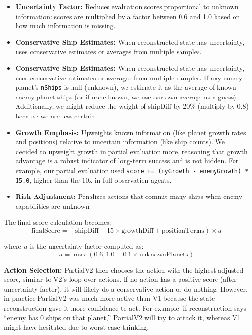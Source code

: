 \documentclass[conference]{IEEEtran}
\begin{document}
\begin{itemize}
\item \textbf{Uncertainty Factor:} Reduces evaluation scores proportional to unknown information: scores are multiplied by a factor between 0.6 and 1.0 based on how much information is missing.

\item \textbf{Conservative Ship Estimates:} When reconstructed state has uncertainty, uses conservative estimates or averages from multiple samples.

\item \textbf{Conservative Ship Estimates:} When reconstructed state has uncertainty, uses conservative estimates or averages from multiple samples. If any enemy planet's \texttt{nShips} is null (unknown), we estimate it as the average of known enemy planet ships (or if none known, we use our own average as a guess). Additionally, we might reduce the weight of shipDiff by 20\% (multiply by 0.8) because we are less certain.

\item \textbf{Growth Emphasis:} Upweights known information (like planet growth rates and positions) relative to uncertain information (like ship counts). We decided to upweight growth in partial evaluation more, reasoning that growth advantage is a robust indicator of long-term success and is not hidden. For example, our partial evaluation used \texttt{score += (myGrowth - enemyGrowth) * 15.0}, higher than the 10x in full observation agents.

\item \textbf{Risk Adjustment:} Penalizes actions that commit many ships when enemy capabilities are unknown.
\end{itemize}

The final score calculation becomes:
\begin{equation}
\text{finalScore} = (\text{shipDiff} + 15 \times \text{growthDiff} + \text{positionTerms}) \times u
\end{equation}

where $u$ is the uncertainty factor computed as:
\begin{equation}
u = \max(0.6, 1.0 - 0.1 \times \text{unknownPlanets})
\end{equation}

\textbf{Action Selection:} PartialV2 then chooses the action with the highest adjusted score, similar to V2's loop over actions. If no action has a positive score (after uncertainty factor), it will likely do a conservative action or do nothing. However, in practice PartialV2 was much more active than V1 because the state reconstruction gave it more confidence to act. For example, if reconstruction says ``enemy has 0 ships on that planet,'' PartialV2 will try to attack it, whereas V1 might have hesitated due to worst-case thinking.
\end{document}

